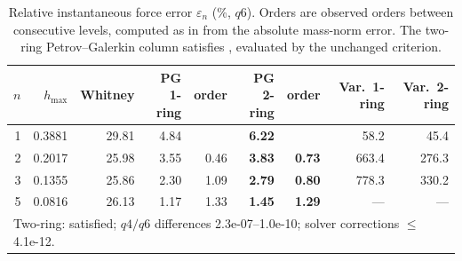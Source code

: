 \begin{table}[t]\centering\small
\caption{Relative instantaneous force error $\varepsilon_n$ (\%, $q6$). Orders are observed orders between consecutive levels, computed as in \BW{} from the absolute mass-norm error. The two-ring Petrov--Galerkin column satisfies \BW{}, evaluated by the unchanged criterion.}
\label{tab:force}
\begin{tabular}{rrrrrrrrr}\toprule
$n$ & $h_{\max}$ & Whitney & PG 1-ring & order & \textbf{PG 2-ring} & \textbf{order} & Var.\ 1-ring & Var.\ 2-ring \\ \midrule
1 & 0.3881 & 29.81 & 4.84 &  & \textbf{6.22} &  & 58.2 & 45.4 \\
2 & 0.2017 & 25.98 & 3.55 & 0.46 & \textbf{3.83} & \textbf{0.73} & 663.4 & 276.3 \\
3 & 0.1355 & 25.86 & 2.30 & 1.09 & \textbf{2.79} & \textbf{0.80} & 778.3 & 330.2 \\
5 & 0.0816 & 26.13 & 1.17 & 1.33 & \textbf{1.45} & \textbf{1.29} & --- & --- \\
\midrule
\multicolumn{9}{l}{Two-ring: \BW{} satisfied; $q4/q6$ differences 2.3e-07--1.0e-10; solver corrections $\le$ 4.1e-12.}\\
\bottomrule\end{tabular}\end{table}
